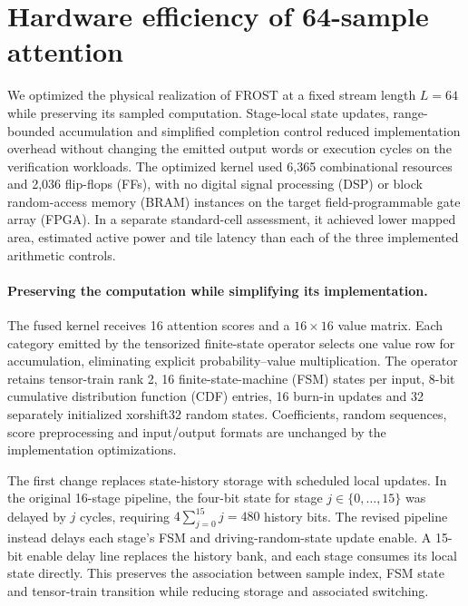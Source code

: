 \section{Hardware efficiency of 64-sample attention}
\label{sec:fpga_evaluation}

We optimized the physical realization of FROST at a fixed stream length
$L=64$ while preserving its sampled computation. Stage-local state
updates, range-bounded accumulation and simplified completion control
reduced implementation overhead without changing the emitted output
words or execution cycles on the verification workloads. The optimized
kernel used 6,365 combinational resources and 2,036 flip-flops (FFs),
with no digital signal processing (DSP) or block random-access memory
(BRAM) instances on the target field-programmable gate array (FPGA).
In a separate standard-cell assessment, it achieved lower mapped area,
estimated active power and tile latency than each of the three
implemented arithmetic controls.

\paragraph{Preserving the computation while simplifying its implementation.}
The fused kernel receives 16 attention scores and a $16\times16$ value
matrix. Each category emitted by the tensorized finite-state operator
selects one value row for accumulation, eliminating explicit
probability--value multiplication. The operator retains tensor-train
rank 2, 16 finite-state-machine (FSM) states per input, 8-bit cumulative
distribution function (CDF) entries, 16 burn-in updates and 32 separately
initialized xorshift32 random states. Coefficients, random sequences,
score preprocessing and input/output formats are unchanged by the
implementation optimizations.

The first change replaces state-history storage with scheduled local
updates. In the original 16-stage pipeline, the four-bit state for stage
$j\in\{0,\ldots,15\}$ was delayed by $j$ cycles, requiring
$4\sum_{j=0}^{15}j=480$ history bits. The revised pipeline instead delays
each stage's FSM and driving-random-state update enable. A 15-bit enable
delay line replaces the history bank, and each stage consumes its local
state directly. This preserves the association between sample index,
FSM state and tensor-train transition while reducing storage and
associated switching.

